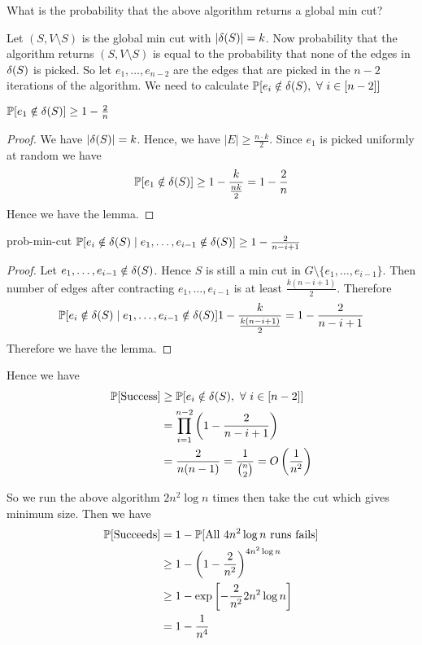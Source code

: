 \begin{question}{}{}
	What is the probability that the above algorithm returns a global min cut?
\end{question}
Let $(S,V\setminus S)$ is the global min cut with $|\delta(S)|=k$. Now probability that the algorithm returns $(S,V\setminus S)$ is equal to the probability that none of the edges in $\delta(S)$ is picked. So let $e_1,\dots, e_{n-2}$ are the edges that are picked in the $n-2$ iterations of the algorithm. We need to calculate $\bbP[e_i\notin \dl(S),\ \forall\ i\in[n-2]]$
\begin{lemma}{}{}
	$\mathbb{P}[e_1\notin \delta(S)]\geq 1-\frac2n$
\end{lemma}
\begin{proof}
	We have $|\delta(S)|=k$. Hence, we have $|E|\geq \frac{n\cdot k}2$. Since $e_1$ is picked uniformly at random we have $$\mathbb{P}[e_1\notin \delta(S)]\geq 1-\frac{k}{\frac{nk}{2} }=1-\frac2n$$Hence we have the lemma.
\end{proof}
\begin{lemma}{}{prob-min-cut}
	$\mathbb{P}[e_i\notin \delta(S)\mid e_1,\dots,e_{i-1}\notin \delta(S)]  \geq 1-\frac{2}{n-i+1}$
\end{lemma}
\begin{proof}
	Let $e_1,\dots, e_{i-1}\notin \delta(S)$. Hence $S$ is still a min cut in $G\setminus\{e_1,\dots, e_{i-1}\}$. Then number of edges after contracting $e_1,\dots, e_{i-1}$ is at least $\frac{k(n-i+1)}2$. Therefore $$\mathbb{P}[e_i\notin \delta(S)\mid e_1,\dots,e_{i-1}\notin \delta(S)]1-\frac{k}{\frac{k(n-i+1)}2}=1-\frac2{n-i+1}$$Therefore we have the lemma.
\end{proof}

Hence we have \begin{align*}
	\bbP[\text{Success}] & \geq \bbP[e_i\notin \dl(S),\ \forall\ i\in[n-2]]              \\
	                     & =\prod\limits_{i=1}^{n-2}\lt(1-\frac{2}{n-i+1}\rt)            \\
	                     & = \frac2{n(n-1)}=\dfrac{1}{\binom{n}{2}}=O\lt(\frac1{n^2}\rt)
\end{align*}

So we run the above algorithm $2n^2\log n$ times then take the cut which gives minimum size. Then we have \begin{align*}
	\mathbb{P}[\text{Succeeds}] & =1-\mathbb{P}[\text{All $4n^2\log n$ runs fails}] \\
	                      & \geq 1- \left(1-\frac2{n^2}\right)^{4n^2\log n}  \\
	                      & \geq 1-\exp\left[-\frac2{n^2}2n^2\log n\right]   \\
	                      & = 1-\frac1{n^4}
\end{align*}

